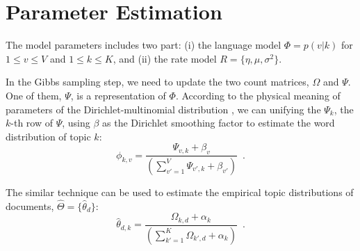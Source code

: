 \section{Parameter Estimation}

The model parameters includes two part: (i) the language model
$\Phi=p(v|k)$ for $1\leq{}v\leq{}V$ and $1\leq{}k\leq{}K$, and (ii)
the rate model $R=\{\eta,\mu,\sigma^2\}$.

In the Gibbs sampling step, we need to update the two count matrices,
$\Omega$ and $\Psi$.  One of them, $\Psi$, is a representation of
$\Phi$.  According to the physical meaning of parameters of the
Dirichlet-multinomial distribution \cite{prml}, we can unifying the
$\Psi_k$, the $k$-th row of $\Psi$, using $\beta$ as the Dirichlet
smoothing factor to estimate the word distribution of topic $k$:
\begin{equation}
  \label{eq:read-out-final}
  \phi_{k,v}
  =
  \frac{
    \Psi_{v,k} + \beta_{v}
  }{
    \left( \sum_{v'=1}^V  \Psi_{v',k} + \beta_{v'} \right)
  }
  \enspace.
\end{equation}

The similar technique can be used to estimate the empirical topic
distributions of documents, $\hat\Theta=\{\hat\theta_d\}$:
\begin{equation}
  \hat\theta_{d,k}
  =
  \frac{
    \Omega_{k,d} + \alpha_k
  }{
    \left( \sum_{k'=1}^K  \Omega_{k',d} + \alpha_k \right)
  }
  \enspace.
\end{equation}

